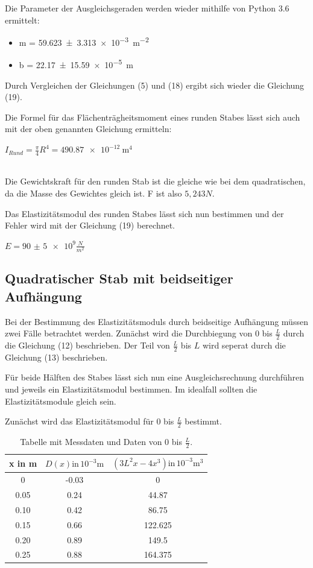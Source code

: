 Die Parameter der Ausgleichsgeraden werden wieder mithilfe von Python 3.6 ermittelt:

\begin{itemize}
  \item m = \SI{59.623(3313)e-3}{\meter\tothe{-2}}
  \item b = \SI{22.17(1559)e-5}{\meter}
\end{itemize}

Durch Vergleichen der Gleichungen (5) und (18) ergibt sich wieder die Gleichung (19).

Die Formel für das Flächenträgheitsmoment eines runden Stabes lässt sich auch mit
der oben genannten Gleichung ermitteln:\\

\centerline{$I_{Rund} = \frac{\pi}{4} R^4 = \SI{490.87e-12}{\meter\tothe{4}}$}\ \\

Die Gewichtskraft für den runden Stab ist die gleiche wie bei dem quadratischen,
da die Masse des Gewichtes gleich ist. F ist also $5,243N$.

Das Elastizitätsmodul des runden Stabes lässt sich nun bestimmen und der Fehler
wird mit der Gleichung (19) berechnet.\\

\centerline{$E = \num{90(5)e9} \frac{N}{m^2}$}

\subsection{Quadratischer Stab mit beidseitiger Aufhängung}

Bei der Bestimmung des Elastizitätsmoduls durch beidseitige Aufhängung müssen zwei
Fälle betrachtet werden. Zunächst wird die Durchbiegung von $0$ bis $\frac{L}{2}$
durch die Gleichung (12) beschrieben. Der Teil von $\frac{L}{2}$ bis $L$ wird seperat
durch die Gleichung (13) beschrieben.

Für beide Hälften des Stabes lässt sich nun eine Ausgleichsrechnung durchführen
und jeweils ein Elastizitätsmodul bestimmen. Im idealfall sollten die
Elastizitätsmodule gleich sein.

Zunächst wird das Elastizitätsmodul für $0$ bis $\frac{L}{2}$ bestimmt.

\begin{table}
  \centering
  \caption{Tabelle mit Messdaten und Daten von $0$ bis $\frac{L}{2}$.}
  \begin{tabular}{c c c}
    \toprule
    x in \si{\meter} & $D(x) \text{in} \, 10^{-3} \si{\meter}$ &
    $ \left( 3L^2x-4x^3 \right) \text{in} \, 10^{-3} \si{\meter\tothe{3}}$\\
    \midrule
    0    & -0.03 & 0 \\
    0.05 & 0.24 & 44.87 \\
    0.10 & 0.42 & 86.75 \\
    0.15 & 0.66 & 122.625 \\
    0.20 & 0.89 & 149.5 \\
    0.25 & 0.88 & 164.375 \\
    \bottomrule
  \end{tabular}
\end{table}

